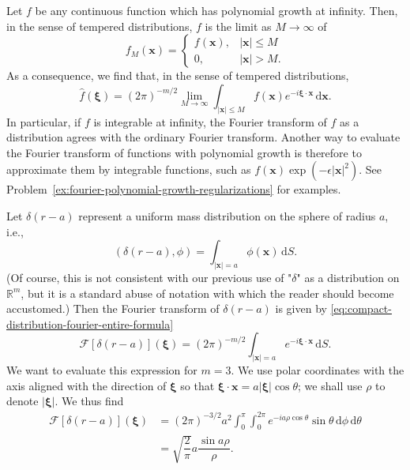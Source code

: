 \begin{Example}
\label{ex:fourier-polynomial-growth-truncation}
Let $f$ be any continuous function which has polynomial growth at infinity. Then, in the sense of tempered distributions, $f$ is the limit as $M\to\infty$ of
\begin{equation}\label{eq:polynomial-growth-function-truncation}
f_M(\bm{x})=\begin{cases}f(\bm{x}),&|\bm{x}|\leq M\\0,&|\bm{x}|>M.\end{cases}
\end{equation}
As a consequence, we find that, in the sense of tempered distributions,
\begin{equation}\label{eq:polynomial-growth-fourier-truncation-limit}
\widehat f(\bm{\xi})=(2\pi)^{-m/2}\lim_{M\to\infty}\int_{|\bm{x}|\leq M}f(\bm{x})e^{-i\bm{\xi}\cdot\bm{x}}\,\mathrm{d}\bm{x}.
\end{equation}
In particular, if $f$ is integrable at infinity, the Fourier transform of $f$ as a distribution agrees with the ordinary Fourier transform. Another way to evaluate the Fourier transform of functions with polynomial growth is therefore to approximate them by integrable functions, such as $f(\bm{x})\exp(-\epsilon|\bm{x}|^2)$. See Problem~\ref{ex:fourier-polynomial-growth-regularizations} for examples.
\end{Example}

\begin{Example}
\label{ex:fourier-uniform-sphere-mass}
Let $\delta(r-a)$ represent a uniform mass distribution on the sphere of radius $a$, i.e.,
\begin{equation}\label{eq:uniform-sphere-mass-pairing}
(\delta(r-a),\phi)=\int_{|\bm{x}|=a}\phi(\bm{x})\,\mathrm{d}S.
\end{equation}
(Of course, this is not consistent with our previous use of "$\delta$" as a distribution on $\mathbb{R}^m$, but it is a standard abuse of notation with which the reader should become accustomed.) Then the Fourier transform of $\delta(r-a)$ is given by \eqref{eq:compact-distribution-fourier-entire-formula}
\begin{equation}\label{eq:uniform-sphere-mass-fourier-integral}
\mathcal{F}[\delta(r-a)](\bm{\xi})=(2\pi)^{-m/2}\int_{|\bm{x}|=a}e^{-i\bm{\xi}\cdot\bm{x}}\,\mathrm{d}S.
\end{equation}
We want to evaluate this expression for $m=3$. We use polar coordinates with the axis aligned with the direction of $\bm{\xi}$ so that $\bm{\xi}\cdot\bm{x}=a|\bm{\xi}|\cos\theta$; we shall use $\rho$ to denote $|\bm{\xi}|$. We thus find
\begin{equation}\label{eq:uniform-sphere-mass-three-dimensional-fourier}
\begin{aligned}
\mathcal{F}[\delta(r-a)](\bm{\xi})
&=(2\pi)^{-3/2}a^2\int_0^\pi\int_0^{2\pi}e^{-ia\rho\cos\theta}\sin\theta\,\mathrm{d}\phi\,\mathrm{d}\theta\\
&=\sqrt{\dfrac2\pi}a\dfrac{\sin a\rho}\rho.
\end{aligned}
\end{equation}

\end{Example}

